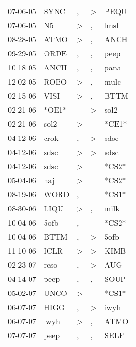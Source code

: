 \begin{supertabular}{lllll}
 07-06-05 &   SYNC &                , &     \textgreater &   PEQU \\
 07-06-05 &     N5 &     \textgreater &                , &   hnsl \\
 08-28-05 &   ATMO &     \textgreater &                , &   ANCH \\
 09-29-05 &   ORDE &                , &                , &   peep \\
 10-18-05 &   ANCH &                , &                , &   pana \\
 12-02-05 &   ROBO &     \textgreater &                , &   mulc \\
 02-15-06 &   VISI &     \textgreater &                , &   BTTM \\
 02-21-06 &  *OE1* &                  &     \textgreater &   sol2 \\
 02-21-06 &   sol2 &     \textgreater &                  &  *CE1* \\
 04-12-06 &   crok &                , &     \textgreater &   sdsc \\
 04-12-06 &   sdsc &     \textgreater &     \textgreater &   sdsc \\
 04-12-06 &   sdsc &     \textgreater &                  &  *CS2* \\
 05-04-06 &    haj &     \textgreater &                  &  *CS2* \\
 08-19-06 &   WORD &                , &                  &  *CS1* \\
 08-30-06 &   LIQU &     \textgreater &                , &   milk \\
 10-04-06 &   5ofb &                , &                  &  *CS2* \\
 10-04-06 &   BTTM &                , &     \textgreater &   5ofb \\
 11-10-06 &   ICLR &     \textgreater &     \textgreater &   KIMB \\
 02-23-07 &   reso &                , &     \textgreater &    AUG \\
 04-14-07 &   peep &                , &                , &   SOUP \\
 05-02-07 &   UNCO &     \textgreater &                  &  *CS1* \\
 06-07-07 &   HIGG &                , &     \textgreater &   iwyh \\
 06-07-07 &   iwyh &     \textgreater &                , &   ATMO \\
 07-07-07 &   peep &                , &                , &   SELF \\

\end{supertabular}
